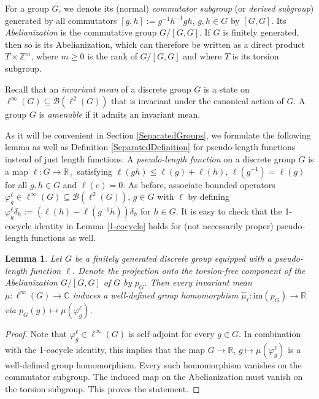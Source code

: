 \documentclass[a4paper,11pt,reqno]{amsart}
\numberwithin{equation}{section}
\numberwithin{equation}{section}
\newtheorem{lemma}[theorem]{Lemma}
\theoremstyle{definition}
\theoremstyle{remark}
\theoremstyle{remark}
\begin{document}
For a group $G$, we denote its (normal) \emph{commutator subgroup}
(or \emph{derived subgroup}) generated by all commutators $[g,h]:=g^{-1}h^{-1}gh$,
$g,h\in G$ by $[G,G]$. Its \emph{Abelianization} is the commutative
group $G/[G,G]$. If $G$ is finitely generated, then so is its Abelianization,
which can therefore be written as a direct product $T\times\mathbb{Z}^{m}$,
where $m\geq0$ is the rank of $G/[G,G]$ and where $T$ is its torsion
subgroup.

Recall that an \emph{invariant mean} of a discrete group $G$ is a
state on $\ell^{\infty}(G)\subseteq\mathcal{B}(\ell^{2}(G))$ that
is invariant under the canonical action of $G$. A group $G$ is \emph{amenable}
if it admits an invariant mean.

As it will be convenient in Section \ref{SeparatedGroups}, we formulate
the following lemma as well as Definition \ref{SeparatedDefinition}
for pseudo-length functions instead of just length functions. A \emph{pseudo-length
function} on a discrete group $G$ is a map $\ell:G\rightarrow\mathbb{R}_{+}$
satisfying $\ell(gh)\leq\ell(g)+\ell(h)$, $\ell(g^{-1})=\ell(g)$
for all $g,h\in G$ and $\ell(e)=0$. As before, associate bounded
operators $\varphi_{g}^{\ell}\in\ell^{\infty}(G)\subseteq\mathcal{B}(\ell^{2}(G))$,
$g\in G$ with $\ell$ by defining $\varphi_{g}^{\ell}\delta_{h}:=(\ell(h)-\ell(g^{-1}h))\delta_{h}$
for $h\in G$. It is easy to check that the 1-cocycle identity in
Lemma \ref{1-cocycle} holds for (not necessarily proper) pseudo-length
functions as well.

\begin{lemma} \label{InducedHomomorphism} Let $G$ be a finitely
generated discrete group equipped with a pseudo-length function $\ell$.
Denote the projection onto the torsion-free component of the Abelianization
$G/[G,G]$ of $G$ by $p_{G}$. Then every invariant mean $\mu:\ell^{\infty}(G)\rightarrow\mathbb{C}$
induces a well-defined group homomorphism $\widehat{\mu}_{\ell}:\text{im}(p_{G})\rightarrow\mathbb{R}$
via $p_{G}(g)\mapsto\mu(\varphi_{g}^{\ell})$. \end{lemma}

\begin{proof} Note that $\varphi_{g}^{\ell}\in\ell^{\infty}(G)$
is self-adjoint for every $g\in G$. In combination with the 1-cocycle
identity, this implies that the map $G\rightarrow\mathbb{R}$, $g\mapsto\mu(\varphi_{g}^{\ell})$
is a well-defined group homomorphism. Every such homomorphism vanishes
on the commutator subgroup. The induced map on the Abelianization
must vanish on the torsion subgroup. This proves the statement. \end{proof}
\end{document}
